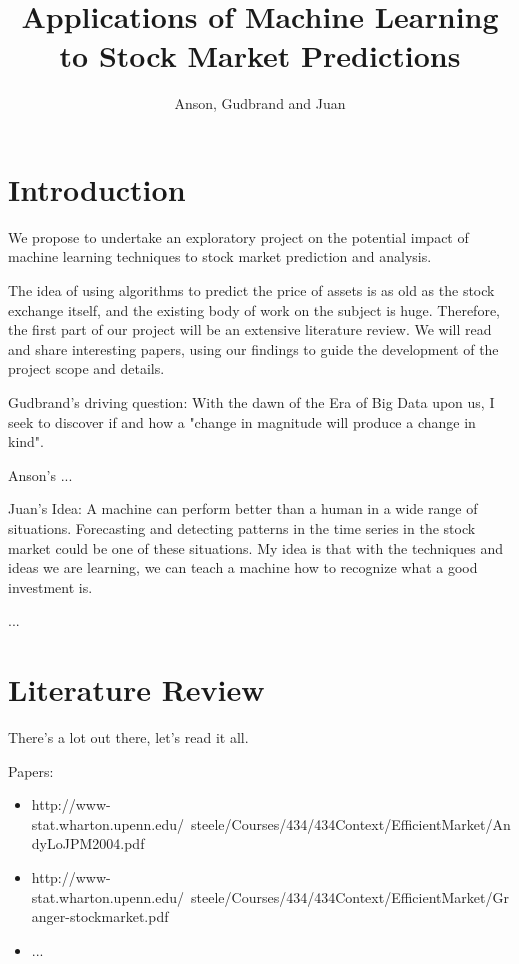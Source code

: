 \documentclass[12pt, oneside]{article}
\title{Applications of Machine Learning to Stock Market Predictions}
\author{Anson, Gudbrand and Juan}
\def\blu#1{{\color{blu}#1}}
\begin{document}
\maketitle

\section{Introduction}

We propose to undertake an exploratory project on the potential impact of machine learning techniques to stock market prediction and analysis. 

The idea of using algorithms to predict the price of assets is as old as the stock exchange itself, and the existing body of work on the subject is huge. Therefore, the first part of our project will be an extensive literature review. We will read and share interesting papers, using our findings to guide the development of the project scope and details.

\blu{Gudbrand's driving question:} With the dawn of the Era of Big Data upon us, I seek to discover if and how a "change in magnitude will produce a change in kind".

\blu{Anson's ...}

\blu{Juan's Idea:} A machine can perform better than a human in a wide range of situations. Forecasting and detecting patterns in the time series in the stock market could be one of these situations.
My idea is that with the techniques and ideas we are learning, we can teach a machine how to recognize what a good investment is.

...

\section{Literature Review}

There's a lot out there, let's read it all.

Papers: 
\begin{itemize}
\item http://www-stat.wharton.upenn.edu/~steele/Courses/434/434Context/EfficientMarket/AndyLoJPM2004.pdf

\item http://www-stat.wharton.upenn.edu/~steele/Courses/434/434Context/EfficientMarket/Granger-stockmarket.pdf

\item ...
\end{itemize}
\end{document}
